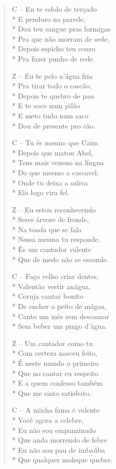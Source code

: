 \begin{verse}
C – Eu te esfolo de terçado\\*
E penduro na parede,\\*
Dou teu sangue pras formigas\\*
Pra que não morram de sede,\\*
Depois espicho teu couro\\*
Pra fazer punho de rede.

Z – Eu te pelo n’água fria\\*
Pra tirar todo o cascão,\\*
Depois te quebro de pau\\*
E te soco num pilão\\*
E meto tudo num saco\\*
Dou de presente pro cão.

C – Tu és mesmo que Caim\\*
Depois que matou Abel,\\*
Tens mais veneno na língua\\*
Do que mesmo a cascavel,\\*
Onde tu deixa a saliva\\*
Ela logo vira fel.

Z – Eu estou reconhecendo\\*
Seres árvore de fronde,\\*
Na toada que se fala\\*
Nessa mesma tu responde,\\*
És um cantador valente\\*
Que de medo não se esconde.

C – Faço velho criar dentes, \\*
Valentão vestir anágua,\\*
Coruja cantar bonito\\*
De encher o peito de mágoa,\\*
Canto um mês sem descansar\\*
Sem beber um pingo d’água.

Z – Um cantador como tu\\*
Com certeza nasceu feito,\\*
É neste mundo o primeiro\\*
Que no cantar eu respeito\\*
E a quem confesso também\\*
Que me sinto satisfeito.

C – A minha fama é valente\\*
Você agora a celebre, \\*
Eu não sou empanzinado\\*
Que anda morrendo de febre\\*
Eu não sou pau de imbaúba\\*
Que qualquer moleque quebre.


\end{verse}
